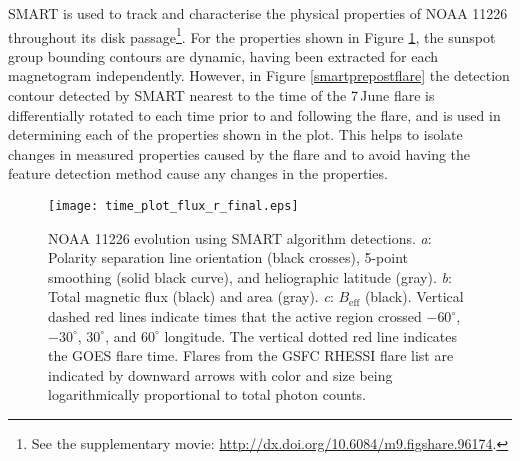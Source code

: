 \gls{SMART} is used to track and characterise the physical properties of NOAA 11226 throughout its disk passage\footnote{See the supplementary movie: \url{http://dx.doi.org/10.6084/m9.figshare.96174}.}. 
For the properties shown in Figure \ref{smart_overview}, the sunspot group bounding contours are dynamic, having been extracted for each magnetogram independently. However, in Figure \ref{smartprepostflare} the detection contour detected by \gls{SMART} nearest to the time of the 7\,June flare is differentially rotated to each time prior to and following the flare, and is used in determining each of the properties shown in the plot. This helps to isolate changes in measured properties caused by the flare and to avoid having the feature detection method cause any changes in the properties.

\begin{figure}[!t]
\centerline{\texttt{[image: time\_plot\_flux\_r\_final.eps]}}
\caption[Long-term NOAA 11226 magnetic evolution.]{NOAA 11226 evolution using SMART algorithm detections. \emph{a}:  Polarity separation line orientation (black crosses), 5-point smoothing (solid black curve), and heliographic latitude (gray). \emph{b}: Total magnetic flux (black) and area (gray). \emph{c}: $B_{\mathrm{eff}}$ (black). Vertical dashed red lines indicate times that the active region crossed $-60^\circ$, $-30^\circ$, $30^\circ$, and $60^\circ$ longitude. The vertical dotted red line indicates the GOES flare time. Flares from the GSFC RHESSI flare list are indicated by downward arrows with color and size being logarithmically proportional to total photon counts.}
\label{smart_overview}
\end{figure}


